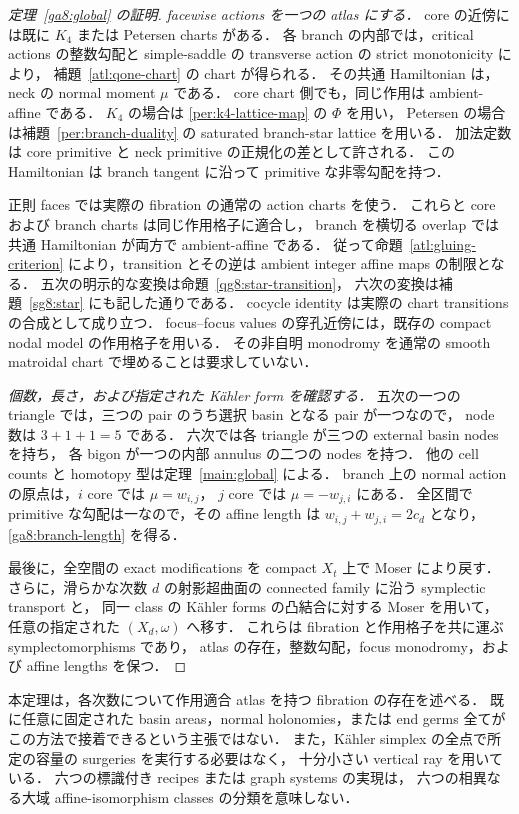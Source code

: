 \begin{proof}[定理~\ref{ga8:global} の証明]
\textit{facewise actions を一つの atlas にする．}
core の近傍には既に $K_4$ または Petersen charts がある．
各 branch の内部では，critical actions の整数勾配と
simple-saddle の transverse action の strict monotonicity により，
補題~\ref{atl:qone-chart} の chart が得られる．
その共通 Hamiltonian は，neck の normal moment $\mu$ である．
core chart 側でも，同じ作用は ambient-affine である．
$K_4$ の場合は \eqref{per:k4-lattice-map} の $\Phi$ を用い，
Petersen の場合は補題~\ref{per:branch-duality} の saturated branch-star lattice を用いる．
加法定数は core primitive と neck primitive の正規化の差として許される．
この Hamiltonian は branch tangent に沿って primitive な非零勾配を持つ．

正則 faces では実際の fibration の通常の action charts を使う．
これらと core および branch charts は同じ作用格子に適合し，
branch を横切る overlap では共通 Hamiltonian が両方で ambient-affine である．
従って命題~\ref{atl:gluing-criterion} により，transition とその逆は
ambient integer affine maps の制限となる．
五次の明示的な変換は命題~\ref{qg8:star-transition}，
六次の変換は補題~\ref{sg8:star} にも記した通りである．
cocycle identity は実際の chart transitions の合成として成り立つ．
focus--focus values の穿孔近傍には，既存の compact nodal model の作用格子を用いる．
その非自明 monodromy を通常の smooth matroidal chart で埋めることは要求していない．

\textit{個数，長さ，および指定された K\"ahler form を確認する．}
五次の一つの triangle では，三つの pair のうち選択 basin となる pair が一つなので，
node 数は $3+1+1=5$ である．
六次では各 triangle が三つの external basin nodes を持ち，
各 bigon が一つの内部 annulus の二つの nodes を持つ．
他の cell counts と homotopy 型は定理~\ref{main:global} による．
branch 上の normal action の原点は，$i$ core では $\mu=w_{i,j}$，
$j$ core では $\mu=-w_{j,i}$ にある．
全区間で primitive な勾配は一なので，その affine length は
$w_{i,j}+w_{j,i}=2c_d$ となり，\eqref{ga8:branch-length} を得る．

最後に，全空間の exact modifications を compact $X_t$ 上で Moser により戻す．
さらに，滑らかな次数 $d$ の射影超曲面の connected family に沿う symplectic transport と，
同一 class の K\"ahler forms の凸結合に対する Moser を用いて，
任意の指定された $(X_d,\omega)$ へ移す．
これらは fibration と作用格子を共に運ぶ symplectomorphisms であり，
atlas の存在，整数勾配，focus monodromy，および affine lengths を保つ．
\end{proof}

\begin{remark}[構成の量化]
本定理は，各次数について作用適合 atlas を持つ fibration の存在を述べる．
既に任意に固定された basin areas，normal holonomies，または end germs 全てが
この方法で接着できるという主張ではない．
また，K\"ahler simplex の全点で所定の容量の surgeries を実行する必要はなく，
十分小さい vertical ray を用いている．
六つの標識付き recipes または graph systems の実現は，
六つの相異なる大域 affine-isomorphism classes の分類を意味しない．
\end{remark}
